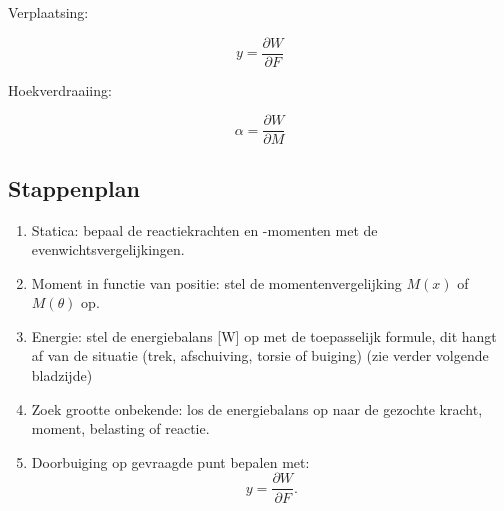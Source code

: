 \documentclass[a4paper,11pt]{article}
\begin{document}
\vspace{1.2em}

\noindent
\begin{minipage}[t]{0.42\textwidth}
\noindent Verplaatsing:

\vspace{0.8em}

\begin{equation}
y = \frac{\partial W}{\partial F}
\end{equation}
\end{minipage}
\hfill
\begin{minipage}[t]{0.45\textwidth}
\noindent Hoekverdraaiing:

\vspace{0.8em}

\begin{equation}
\alpha = \frac{\partial W}{\partial M}
\end{equation}
\end{minipage}






\newpage
\subsection*{Stappenplan}


\begin{enumerate}
    \item Statica: bepaal de reactiekrachten en -momenten met de evenwichtsvergelijkingen.
    \item Moment in functie van positie: stel de momentenvergelijking $M(x)$ of $M(\theta)$ op.
    \item Energie: stel de energiebalans [W] op met de toepasselijk formule, dit hangt af van de situatie (trek, afschuiving, torsie of buiging) \hspace{2.8cm} {\small (zie verder volgende bladzijde)}
   
    \item Zoek grootte onbekende: los de energiebalans op naar de gezochte kracht, moment, belasting of reactie.
    
    \item Doorbuiging op gevraagde punt bepalen met: 
    \[
    y = \frac{\partial W}{\partial F}.
    \]
\end{enumerate}






\vspace{.8cm}
\end{document}
